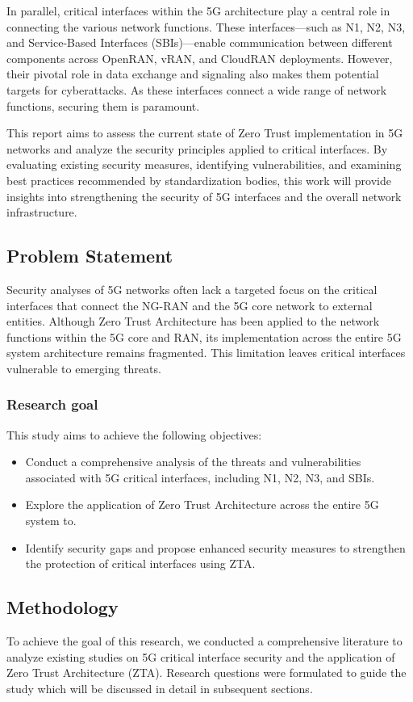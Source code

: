 \documentclass{report}
\begin{document}
In parallel, critical interfaces within the 5G architecture play a central role in connecting the various network functions. These interfaces—such as N1, N2, N3, and Service-Based Interfaces (SBIs)—enable communication between different components across OpenRAN, vRAN, and CloudRAN deployments. However, their pivotal role in data exchange and signaling also makes them potential targets for cyberattacks. As these interfaces connect a wide range of network functions, securing them is paramount.

This report aims to assess the current state of Zero Trust implementation in 5G networks and analyze the security principles applied to critical interfaces. By evaluating existing security measures, identifying vulnerabilities, and examining best practices recommended by standardization bodies, this work will provide insights into strengthening the security of 5G interfaces and the overall network infrastructure.

\subsection{Problem Statement}
Security analyses of 5G networks often lack a targeted focus on the critical interfaces that connect the NG-RAN and the 5G core network to external entities. Although Zero Trust Architecture has been applied to the network functions within the 5G core and RAN, its implementation across the entire 5G system architecture remains fragmented. This limitation leaves critical interfaces vulnerable to emerging threats. 


\subsubsection{Research goal}
This study aims to achieve the following objectives:
\begin{itemize}
    \item Conduct a comprehensive analysis of the threats and vulnerabilities associated with 5G critical interfaces, including N1, N2, N3, and SBIs.
    \item Explore the application of Zero Trust Architecture across the entire 5G system to.
    \item Identify security gaps and propose enhanced security measures to strengthen the protection of critical interfaces using ZTA.
\end{itemize}

\subsection{Methodology}
To achieve the goal of this research, we conducted a comprehensive literature  to analyze existing studies on 5G critical interface security and the application of Zero Trust Architecture (ZTA). Research questions were formulated to guide the study which will be discussed in detail in subsequent sections. 
\end{document}
